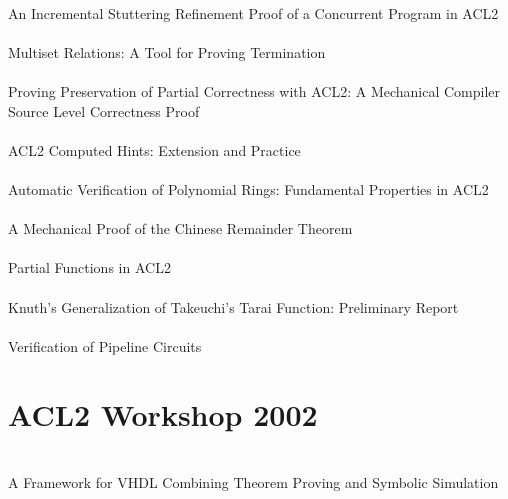 \documentclass{article}
\begin{document}
\cite{00-sumners-stuttering} \\
An Incremental Stuttering Refinement Proof of a Concurrent Program in ACL2 \\

\cite{00-reina-multiset} \\
Multiset Relations: A Tool for Proving Termination \\

\cite{00-goerigk} \\
Proving Preservation of Partial Correctness with ACL2: A Mechanical Compiler Source Level Correctness Proof \\

\cite{00-sawada-computed} \\
ACL2 Computed Hints: Extension and Practice \\

\cite{00-bulo-polynomial} \\
Automatic Verification of Polynomial Rings: Fundamental Properties in ACL2 \\

\cite{00-russinoff-chinese} \\
A Mechanical Proof of the Chinese Remainder Theorem \\

\cite{00-manolios-partial} \\
Partial Functions in ACL2 \\

\cite{00-bailey-tarai} \\
Knuth's Generalization of Takeuchi's Tarai Function: Preliminary Report \\

\cite{00-kaufmann-pipeline} \\
Verification of Pipeline Circuits \\


\section{ACL2 Workshop 2002}

\cite{02-barrione-vhdl} \\
A Framework for VHDL Combining Theorem Proving and Symbolic Simulation \\
\end{document}
